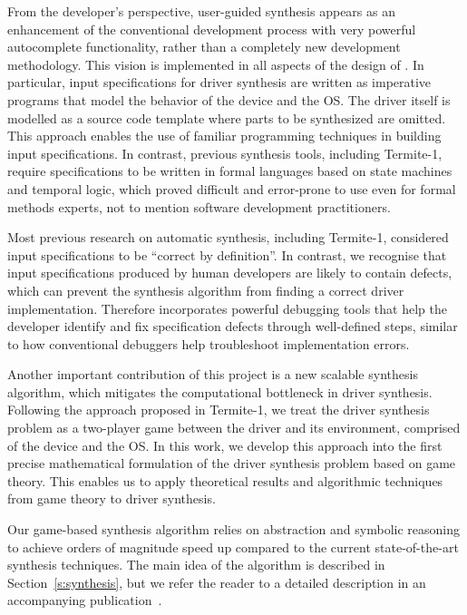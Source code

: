 From the developer's perspective, user-guided synthesis appears as an enhancement of the conventional development process with very powerful autocomplete functionality, rather than a completely new development methodology.  This vision is implemented in all aspects of the design of \termite.  In particular, input specifications for driver synthesis are written as imperative programs that model the behavior of the device and the OS.  The driver itself is modelled as a source code template where parts to be synthesized are omitted.  This approach enables the use of familiar programming techniques in building input specifications.  In contrast, previous synthesis tools, including Termite-1, require specifications to be written in formal languages based on state machines and temporal logic, which proved difficult and error-prone to use even for formal methods experts, not to mention software development practitioners.

Most previous research on automatic synthesis, including Termite-1, considered input specifications to be ``correct by definition''.  In contrast, we recognise that input specifications produced by human developers are likely to contain defects, which can prevent the synthesis algorithm from finding a correct driver implementation.  Therefore \termite incorporates powerful debugging tools that help the developer identify and fix specification defects through well-defined steps, similar to how conventional debuggers help troubleshoot implementation errors.

Another important contribution of this project is a new scalable synthesis algorithm, which mitigates the computational bottleneck in driver synthesis.  Following the approach proposed in Termite-1, we treat the driver synthesis problem as a two-player game between the driver and its environment, comprised of the device and the OS.  In this work, we develop this approach into the first precise mathematical formulation of the driver synthesis problem based on game theory.  This enables us to apply theoretical results and algorithmic techniques from game theory to driver synthesis.  

Our game-based synthesis algorithm relies on abstraction and symbolic reasoning to achieve orders of magnitude speed up compared to the current state-of-the-art synthesis techniques.  The main idea of the algorithm is described in Section~\ref{s:synthesis}, but we refer the reader to a detailed description in an accompanying publication~\cite{Walker_Ryzhyk_14}. 

